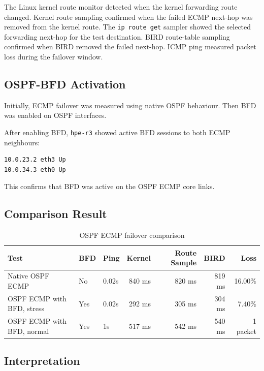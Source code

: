 The Linux kernel route monitor detected when the kernel forwarding route changed. Kernel route sampling confirmed when the failed ECMP next-hop was removed from the kernel route. The \texttt{ip route get} sampler showed the selected forwarding next-hop for the test destination. BIRD route-table sampling confirmed when BIRD removed the failed next-hop. ICMP ping measured packet loss during the failover window.

\subsection{OSPF-BFD Activation}

Initially, ECMP failover was measured using native OSPF behaviour. Then BFD was enabled on OSPF interfaces.

After enabling BFD, \texttt{hpe-r3} showed active BFD sessions to both ECMP neighbours:

\begin{verbatim}
10.0.23.2 eth3 Up
10.0.34.3 eth0 Up
\end{verbatim}

This confirms that BFD was active on the OSPF ECMP core links.

\subsection{Comparison Result}

\begin{table}[h]
\centering
\scriptsize
\begin{tabular}{|l|l|l|r|r|r|r|}
\hline
\textbf{Test} & \textbf{BFD} & \textbf{Ping} & \textbf{Kernel} & \textbf{Route Sample} & \textbf{BIRD} & \textbf{Loss} \\
\hline
Native OSPF ECMP & No & 0.02s & 840 ms & 820 ms & 819 ms & 16.00\% \\
\hline
OSPF ECMP with BFD, stress & Yes & 0.02s & 292 ms & 305 ms & 304 ms & 7.40\% \\
\hline
OSPF ECMP with BFD, normal & Yes & 1s & 517 ms & 542 ms & 540 ms & 1 packet \\
\hline
\end{tabular}
\caption{OSPF ECMP failover comparison}
\end{table}

\subsection{Interpretation}

